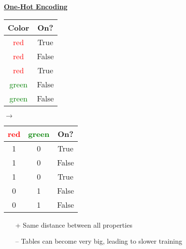     {\centering \underline{\textbf{One-Hot Encoding}} \par}
    \begin{minipage}{0.39\linewidth}
        \begin{tabular*}{\linewidth}{c | c}
            Color & On?\\
            \hline \hline
            \textcolor{red}{red} & True\\
            \hline
            \textcolor{red}{red} & False\\
            \hline
            \textcolor{red}{red} & True\\
            \hline
            \textcolor{green}{green} & False\\
            \hline
            \textcolor{green}{green} & False        
        \end{tabular*}
    \end{minipage}
    \begin{minipage}{0.09\linewidth}
        \huge $\rightarrow$
    \end{minipage}
    \begin{minipage}{0.49\linewidth}
        \begin{tabular*}{\linewidth}{c | c | c}
            \textcolor{red}{red} & \textcolor{green}{green} & On?\\
            \hline \hline
            1 & 0 & True\\
            \hline
            1 & 0 & False\\
            \hline
            1 & 0 & True\\
            \hline
            0 & 1 & False\\
            \hline
            0 & 1 & False        
        \end{tabular*}
    \end{minipage}
    \begin{itemize}
        \item[+] Same distance between all properties
        \item[--] Tables can become very big, leading to slower training
    \end{itemize}
    